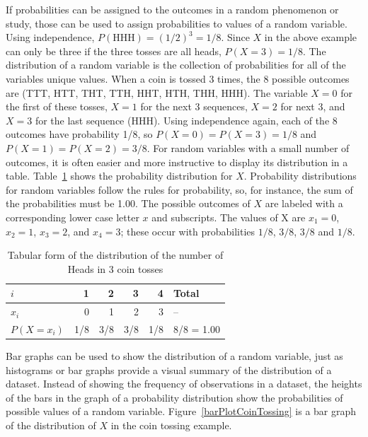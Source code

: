 \begin{doublespace}
If probabilities can be assigned to the outcomes in a random phenomenon or study, those can be used to assign probabilities to values of a random variable.  Using independence, $P(\text{HHH}) = (1/2)^3 = 1/8$.  Since $X$ in the above example can only be three if the three tosses are all heads, $P(X=3) = 1/8$.  The distribution of a random variable is the collection of probabilities for all of the variables unique values.  When a coin is tossed 3 times, the 8 possible outcomes are (TTT, HTT, THT, TTH, HHT, HTH, THH, HHH). The variable $X = 0$ for the first of these tosses, $X = 1$ for the next 3 sequences, $X = 2$ for next 3, and $X = 3$ for the last sequence (HHH).  Using independence again, each of the 8 outcomes have probability 1/8, so $P(X = 0) = P(X = 3) = 1/8$ and $P(X = 1) = P(X = 2) = 3/8$. For random variables with a small number of outcomes, it is often easier and more instructive to display its distribution in a table. Table~\ref{distCoinTossing} shows the probability distribution for $X$.  Probability distributions for random variables follow the rules for probability, so, for instance, the sum of the probabilities must be 1.00.  The possible outcomes of $X$ are labeled with a corresponding lower case letter $x$ and subscripts.  The values of X are $x_1=0$, $x_2=1$,  $x_3 = 2$, and $x_4 = 3$; these occur with probabilities $1/8$, $3/8$, $3/8$ and $1/8$.

\begin{table}[h]
\centering 
\begin{tabular}{l rrrr l}
	\hline 
	$i$ & 1 & 2 & 3 & 4 & Total\\
	\hline
	$x_i$ & 0 & 1 & 2 & 3 & --\\
	 $P(X = x_i)$ & 1/8 & 3/8 & 3/8 & 1/8 & 8/8 = 1.00\\
\end{tabular}
\caption{Tabular form of the distribution of the number of Heads in 3 coin tosses}
\label{distCoinTossing}
\end{table}

Bar graphs can be used to show the distribution of a random variable, just as histograms or bar graphs provide a visual summary of the distribution of a dataset. Instead of showing the frequency of observations in a dataset, the heights of the bars in the graph of a probability distribution show the probabilities of possible values of a random variable.  Figure~\ref{barPlotCoinTossing} is a bar graph of the distribution of $X$ in the coin tossing example.


\end{doublespace}
